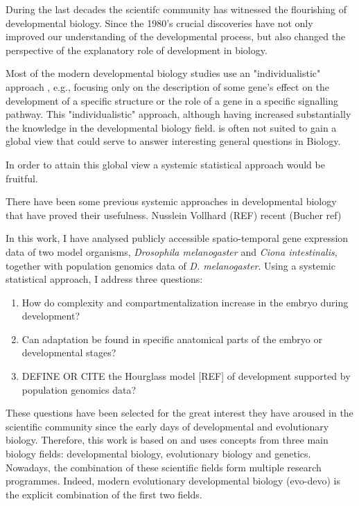 
During the last decades the scientifc community has witnessed the flourishing of developmental biology. Since the 1980's crucial discoveries \citep{Gilbert1998} have not only improved our understanding of the developmental process, but also changed the perspective of the explanatory role of development in biology.

Most of the modern developmental biology studies use an "individualistic" approach \citep{Davidson2009}, e.g., focusing only on the description of some gene's effect on the development of a specific structure or the role of a gene in a specific signalling pathway.
%
This "individualistic" approach, although having increased substantially the knowledge in the developmental biology field.  is often not suited to gain a global view that could serve to answer interesting general questions in Biology. 

In order to attain this global view a systemic statistical approach would be fruitful.

There have been some previous systemic approaches in developmental biology that have proved their usefulness.
Nusslein Vollhard (REF) recent (Bucher ref)

In this work, I have analysed publicly accessible spatio-temporal gene expression data of two model organisms, \textit{Drosophila melanogaster} and \textit{Ciona intestinalis}, together with population genomics data of \textit{D. melanogaster}.
Using a systemic statistical approach, I address three questions:
\begin{enumerate}
\item How do complexity and compartmentalization increase in the embryo during development?
\item Can adaptation be found in specific anatomical parts of the embryo or developmental stages? 
\item DEFINE OR CITE  the Hourglass model [REF] of development supported by population genomics data?
\end{enumerate}

These questions have been selected for the great interest they have aroused in the scientific community since the early days of developmental and evolutionary biology.
%
Therefore, this work is based on and uses concepts from three main biology fields: 
developmental biology, evolutionary biology and genetics.
Nowadays, the combination of these scientific fields form multiple research programmes. Indeed, modern evolutionary developmental biology (evo-devo) is the explicit combination of the first two fields.

